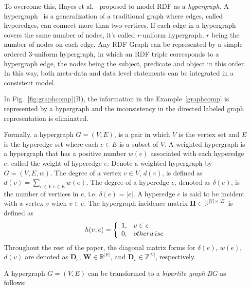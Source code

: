 To overcome this, Hayes et al.~\cite{GraphModelRDF} proposed to model RDF as a \emph{hypergraph}. A hypergraph~\cite{Hypergraph} is a generalization of a traditional graph where edges, called hyperedges, can connect more than two vertices. If each edge in a hypergraph covers the same number of nodes, it's called $r$-uniform hypergraph, $r$ being the number of nodes on each edge. Any RDF Graph can be represented by a simple ordered 3-uniform hypergraph, in which an RDF triple corresponds to a hypergraph edge, the nodes being the subject, predicate and object in this order. In this way, both meta-data and data level statements can be integrated in a consistent model.

In Fig.~\ref{fig:graphcomp}(B), the information in the Example~\ref{graphcomp} is represented by a hypergraph and the inconsistency in the directed labeled graph representation is eliminated.

\begin{mydef}
Formally, a hypergraph $G = (V,E)$, is a pair in which $V$ is the vertex set and $E$ is the hyperedge set where each $e \in E$ is a subset of $V$. A weighted hypergraph is a hypergraph that has a positive number $w(e)$ associated with each hyperedge $e$; called the weight of hyperedge $e$: Denote a weighted hypergraph by $G = (V,E,w)$. The degree of a vertex $v \in V$, $d(v)$, is defined as $d(v) = \sum_{v\in V, e\in E}{w(e)}$. The degree of a hyperedge $e$, denoted as $\delta(e)$, is the number of vertices in $e$, i.e. $\delta(e)=|e|$. A hyperedge $e$ is said to be incident with a vertex $v$ when $v \in e$. The hypergraph incidence matrix $\mathbf{H} \in \mathbb{R}^{|V| \times |E|}$ is defined as
\begin{equation}
\notag h(v,e)=\left\{\begin{array}{cl}
	   1, & v \in e \\
	   0, & otherwise
	   \end{array}\right.
\end{equation}
Throughout the rest of the paper, the diagonal matrix forms for $\delta(e)$, $w(e)$, $d(v)$ are denoted as $\mathbf{D}_e$, $\mathbf{W} \in \mathbb{R}^{|E|}$, and $\mathbf{D}_v \in \mathbb{Z}^{|V|}$, respectively.
\end{mydef}

A hypergraph $G = (V, E)$ can be transformed to a \emph{bipartite graph} $BG$ as follows:

